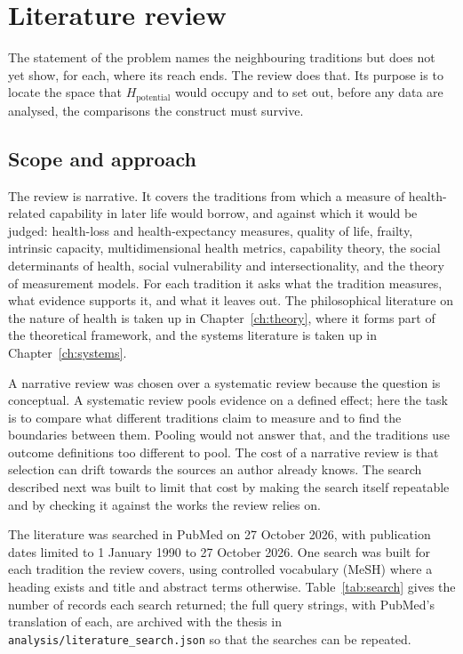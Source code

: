 \section{Literature review}
\label{sec:intro-review}

The statement of the problem names the neighbouring traditions but does not yet show, for each, where its reach ends. The review does that. Its purpose is to locate the space that $H_{\text{potential}}$ would occupy and to set out, before any data are analysed, the comparisons the construct must survive.

\subsection{Scope and approach}

The review is narrative. It covers the traditions from which a measure of health-related capability in later life would borrow, and against which it would be judged: health-loss and health-expectancy measures, quality of life, frailty, intrinsic capacity, multidimensional health metrics, capability theory, the social determinants of health, social vulnerability and intersectionality, and the theory of measurement models. For each tradition it asks what the tradition measures, what evidence supports it, and what it leaves out. The philosophical literature on the nature of health is taken up in Chapter~\ref{ch:theory}, where it forms part of the theoretical framework, and the systems literature is taken up in Chapter~\ref{ch:systems}.

A narrative review was chosen over a systematic review because the question is conceptual. A systematic review pools evidence on a defined effect; here the task is to compare what different traditions claim to measure and to find the boundaries between them. Pooling would not answer that, and the traditions use outcome definitions too different to pool. The cost of a narrative review is that selection can drift towards the sources an author already knows. The search described next was built to limit that cost by making the search itself repeatable and by checking it against the works the review relies on.

The literature was searched in PubMed on 27 October 2026, with publication dates limited to 1 January 1990 to 27 October 2026. One search was built for each tradition the review covers, using controlled vocabulary (MeSH) where a heading exists and title and abstract terms otherwise. Table~\ref{tab:search} gives the number of records each search returned; the full query strings, with PubMed's translation of each, are archived with the thesis in \texttt{analysis/literature\_search.json} so that the searches can be repeated.

